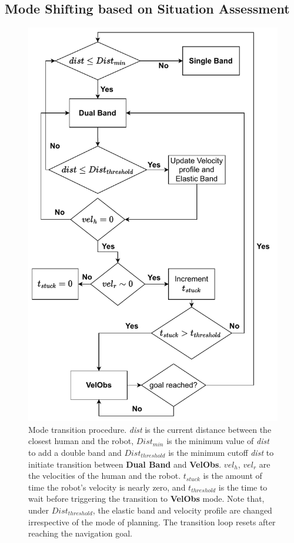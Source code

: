 \subsection{Mode Shifting based on Situation Assessment}
\begin{figure}[!h]
\centering
\includegraphics[width=0.78\columnwidth]{images/chapter3/final_flow_chart.pdf}
\caption{Mode transition procedure. \textit{dist} is the current distance between the closest human and the robot, $Dist_{min}$ is the minimum value of \textit{dist} to add a double band and $Dist_{threshold}$ is the minimum cutoff \textit{dist} to initiate transition between \textbf{Dual Band} and \textbf{VelObs}. $vel_h$, $vel_r$ are the velocities of the human and the robot. $t_{stuck}$ is the amount of time the robot's velocity is nearly zero, and $t_{threshold}$ is the time to wait before triggering the transition to \textbf{VelObs} mode. Note that, under $Dist_{threshold}$, the elastic band and velocity profile are changed irrespective of the mode of planning. The transition loop resets after reaching the navigation goal.}
\label{mode_shift}
\end{figure}

